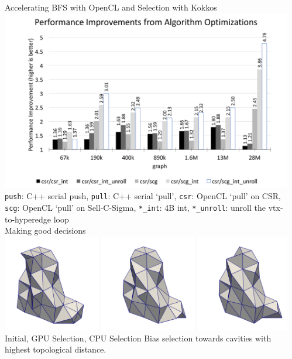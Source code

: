 \documentclass[final]{beamer}
\newlength{\sepwid}
\newlength{\onecolwid}
\begin{document}
\begin{frame}[t]
\begin{columns}[t]
\begin{column}{\onecolwid}
\begin{block}{Accelerating BFS with OpenCL and Selection with Kokkos}
  {
    \centering
    \includegraphics[width=.97\textwidth]{../accelerated_cse19/results/openclBfs.png} \\
    { \small
    \texttt{push}: C++ serial push,
    \texttt{pull}: C++ serial `pull',
    \texttt{csr}: OpenCL `pull' on CSR, 
    \texttt{scg}: OpenCL `pull' on Sell-C-Sigma,
    \texttt{*\_int}: 4B int,
    \texttt{*\_unroll}: unroll the vtx-to-hyperedge loop
    }
  }\\
  { \centering
    Making good decisions \\
    \includegraphics[width=\textwidth]{../accelerated_cse19/figures/selectionEx.png}\\
    Initial, GPU Selection, CPU Selection
  }
  Bias selection towards cavities with highest topological distance.
\end{block}


\end{column} %

\begin{column}{\sepwid}\end{column} %

\end{columns} %

\end{frame} %
\end{document}
